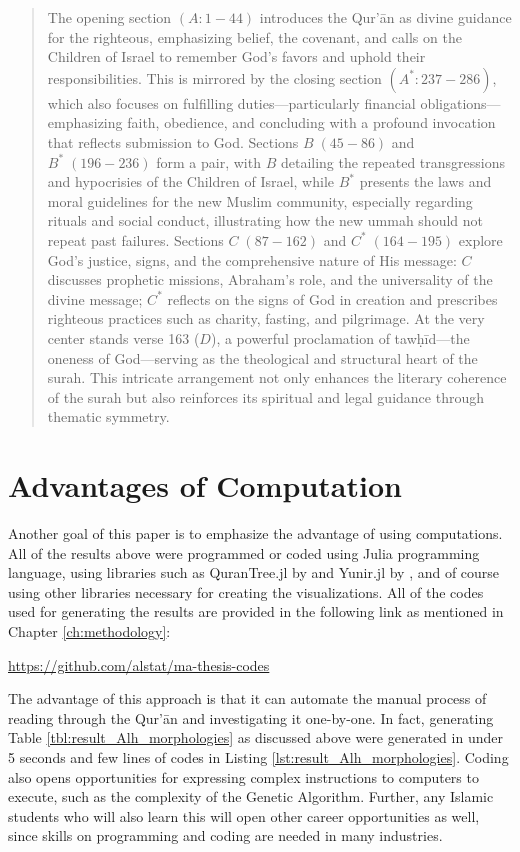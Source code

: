 \begin{quotation}
    The opening section $(A: 1-44)$ introduces the Qur'\=an as divine guidance for the righteous, emphasizing belief, the covenant, and calls on the Children of Israel to remember God's favors and uphold their responsibilities. This is mirrored by the closing section $(A^*: 237-286)$, which also focuses on fulfilling duties—particularly financial obligations—emphasizing faith, obedience, and concluding with a profound invocation that reflects submission to God. Sections $B\;(45-86)$ and $B^*\;(196-236)$ form a pair, with $B$ detailing the repeated transgressions and hypocrisies of the Children of Israel, while $B^*$ presents the laws and moral guidelines for the new Muslim community, especially regarding rituals and social conduct, illustrating how the new ummah should not repeat past failures. Sections $C\;(87-162)$ and $C^*\;(164-195)$ explore God's justice, signs, and the comprehensive nature of His message: $C$ discusses prophetic missions, Abraham's role, and the universality of the divine message; $C^*$ reflects on the signs of God in creation and prescribes righteous practices such as charity, fasting, and pilgrimage. At the very center stands verse 163 ($D$), a powerful proclamation of tawḥīd—the oneness of God—serving as the theological and structural heart of the surah. This intricate arrangement not only enhances the literary coherence of the surah but also reinforces its spiritual and legal guidance through thematic symmetry.
\end{quotation}

\section{Advantages of Computation}
Another goal of this paper is to emphasize the advantage of using computations. All of the results above were programmed or coded using Julia programming language, using libraries such as QuranTree.jl by  and Yunir.jl by , and of course using other libraries necessary for creating the visualizations. All of the codes used for generating the results are provided in the following link as mentioned in Chapter \ref{ch:methodology}:
\begin{center}
\url{https://github.com/alstat/ma-thesis-codes}
\end{center}
The advantage of this approach is that it can automate the manual process of reading through the Qur'\=an and investigating it one-by-one. In fact, generating Table \ref{tbl:result_Alh_morphologies} as discussed above were generated in under 5 seconds and few lines of codes in Listing \ref{lst:result_Alh_morphologies}. Coding also opens opportunities for expressing complex instructions to computers to execute, such as the complexity of the Genetic Algorithm. Further, any Islamic students who will also learn this will open other career opportunities as well, since skills on programming and coding are needed in many industries.
